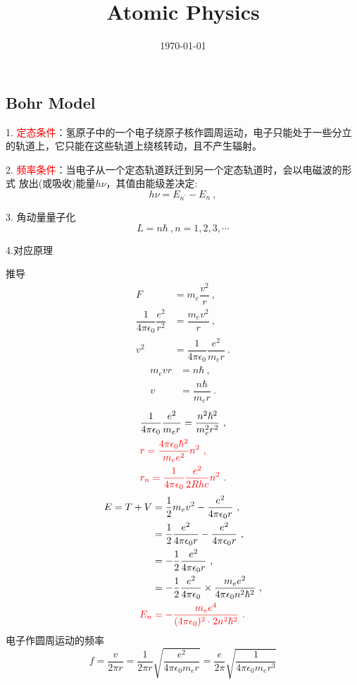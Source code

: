 \documentclass[12pt,a4paper]{article}
\title{Atomic Physics}
\author{}
\date{\today}
\begin{document}
\maketitle


\subsection{Bohr Model}
1. \textcolor{red}{定态条件}：氢原子中的一个电子绕原子核作圆周运动，电子只能处于一些分立的轨道上，它只能在这些轨道上绕核转动，且不产生辐射。

2. \textcolor{red}{频率条件}：当电子从一个定态轨道跃迁到另一个定态轨道时，会以电磁波的形式 放出(或吸收)能量$h\nu$，其值由能级差决定:
\begin{equation}
h\nu = E_{n^\prime} - E_{n} ~,
\end{equation}

3. 角动量量子化
\begin{equation}
L = n \hbar ~, n = 1, 2, 3, ⋯
\end{equation}

4.对应原理



推导
\begin{align*}
F &= m_e \dfrac{v^2}{r} ~, \\
\dfrac{1}{4\pi \epsilon_0} \dfrac{e^2}{r^2} &= \dfrac{m_e v^2}{r} ~, \\
v^2 &= \dfrac{1}{4\pi \epsilon_0} \dfrac{e^2}{m_e r} ~.
\end{align*}
\begin{align*}
m_e vr &= n\hbar ~, \\
v &= \dfrac{n \hbar}{m_e r} ~.
\end{align*}
\begin{align}
\nonumber  & \dfrac{1}{4\pi \epsilon_0} \dfrac{e^2}{m_e r} = \dfrac{n^2 \hbar^2}{m_e^2 r^2} ~, \\
& \color{red} r = \dfrac{4\pi \epsilon_0 \hbar^2}{m_e e^2} n^2 ~, \\
& \color{red} r_n = \dfrac{1}{4\pi \epsilon_0} \dfrac{e^2}{2Rhc} n^2 ~.
\end{align}
\begin{align}
\nonumber E = T +V &= \dfrac{1}{2} m_e v^2 -\dfrac{e^2}{4\pi \epsilon_0 r} ~, \\
\nonumber &= \dfrac{1}{2} \dfrac{e^2}{4\pi \epsilon_0 r} - \dfrac{e^2}{4\pi \epsilon_0 r} ~, \\
\nonumber &= -\dfrac{1}{2}  \dfrac{e^2}{4\pi \epsilon_0 r} ~, \\
\nonumber &= -\dfrac{1}{2}  \dfrac{e^2}{4\pi \epsilon_0 } \times \dfrac{m_e e^2 }{4\pi \epsilon_0 n^2\hbar^2} ~, \\
\color{red} E_n & \color{red}= - \dfrac{m_e e^4}{(4\pi \epsilon_0)^2 \cdot 2 n^2\hbar^2} ~. \\
\end{align}
电子作圆周运动的频率
\begin{equation}
f = \dfrac{v}{2\pi r} = \dfrac{1}{2\pi r} \sqrt{\dfrac{e^2}{4\pi \epsilon_0 m_e r}} = \dfrac{e}{2\pi} \sqrt{\dfrac{1}{4\pi \epsilon_0 m_e r^3}}
\end{equation}
\end{document}
